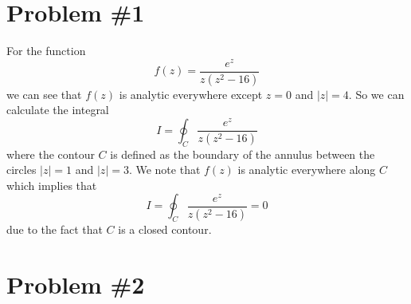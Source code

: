 \documentclass[11pt]{article}
\numberwithin{equation}{section}
\begin{document}


\section{Problem \#1}
For the function 
$$f(z) = \frac{e^z}{z(z^2-16)}$$
we can see that $f(z)$ is analytic everywhere except $z=0$ and $|z|=4$. So we can calculate 
the integral 
$$I = \oint_{C}\frac{e^z}{z(z^2-16)}$$
where the contour $C$ is defined as the boundary of the annulus between the circles $|z|=1$
and $|z|=3$. We note that $f(z)$ is analytic everywhere along $C$ which implies that 
$$I = \oint_{C}\frac{e^z}{z(z^2-16)}=0$$
due to the fact that $C$ is a closed contour.

\section{Problem \#2}
\end{document}
